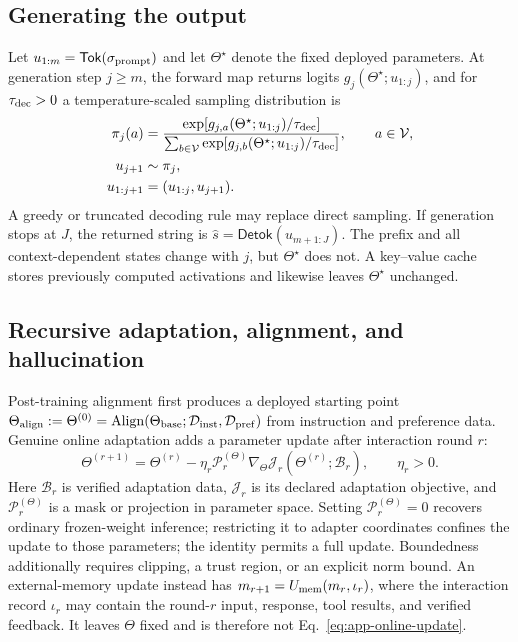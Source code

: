 \documentclass[
  aps,
  reprint,
  superscriptaddress,
  floatfix,
  nofootinbib,
  longbibliography
]{revtex4-2}
\begin{document}
\subsection{Generating the output}
\label{app:generation}

Let $u_{1:m}=\mathsf{Tok}(\sigma_{\rm prompt})$ and let $\Theta^\star$ denote the
fixed deployed parameters.  At generation step $j\geq m$, the forward map
returns logits $g_j(\Theta^\star;u_{1:j})$, and for
$\tau_{\rm dec}>0$ a temperature-scaled sampling distribution is
%
\begin{align}
\pi_j(a)
&=
\frac{\exp\!\left[g_{j,a}(\Theta^\star;u_{1:j})/\tau_{\rm dec}\right]}
{\sum_{b\in\mathcal V}
\exp\!\left[g_{j,b}(\Theta^\star;u_{1:j})/\tau_{\rm dec}\right]},
\qquad a\in\mathcal V,
\nonumber\\
u_{j+1}&\sim\pi_j,
\nonumber\\
u_{1:j+1}&=(u_{1:j},u_{j+1}).
\label{eq:app-generation}
\end{align}
%
A greedy or truncated decoding rule may replace direct sampling.  If
generation stops at $J$, the returned string is
$\widehat s=\mathsf{Detok}(u_{m+1:J})$.  The prefix and all context-dependent
states change with $j$, but $\Theta^\star$ does not.  A key--value cache stores
previously computed activations and likewise leaves $\Theta^\star$ unchanged.

\subsection{Recursive adaptation, alignment, and hallucination}
\label{app:online}

Post-training alignment first produces a deployed starting point
$\Theta_{\rm align}:=\Theta^{(0)}=
\operatorname{Align}(\Theta_{\rm base};\mathcal D_{\rm inst},
\mathcal D_{\rm pref})$ from instruction and preference data.  Genuine online
adaptation adds a parameter update after interaction round $r$:
%
\begin{equation}
\label{eq:app-online-update}
\Theta^{(r+1)}
=\Theta^{(r)}-\eta_r\mathcal P_r^{(\Theta)}
\nabla_\Theta\mathcal J_r
(\Theta^{(r)};\mathcal B_r),
\qquad \eta_r>0.
\end{equation}
%
Here $\mathcal B_r$ is verified adaptation data, $\mathcal J_r$ is its declared
adaptation objective, and $\mathcal P_r^{(\Theta)}$ is a mask or projection in
parameter space.  Setting $\mathcal P_r^{(\Theta)}=0$ recovers ordinary
frozen-weight inference; restricting it to adapter coordinates confines the
update to those parameters; the identity permits a full update.  Boundedness
additionally requires clipping, a trust region, or an explicit norm bound.  An
external-memory update instead has
$m_{r+1}=U_{\rm mem}(m_r,\iota_r)$, where the interaction record $\iota_r$ may
contain the round-$r$ input, response, tool results, and verified feedback.
It leaves $\Theta$ fixed and is therefore not
Eq.~\eqref{eq:app-online-update}.
\end{document}
